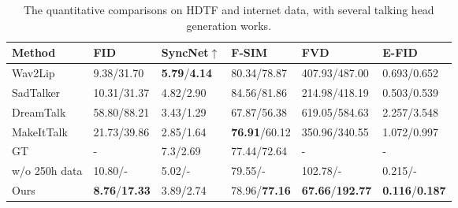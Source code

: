 \begin{table}[h!]
  \centering
  \caption{The quantitative comparisons on HDTF and internet data, with several talking head generation works.}
  \label{tab:quantitative_comp}
  \begin{tabularx}{\textwidth}{l>{\centering\arraybackslash}X>{\centering\arraybackslash}X>{\centering\arraybackslash}X>{\centering\arraybackslash}X>{\centering\arraybackslash}X}
    \toprule
    Method & FID & SyncNet$\uparrow$ & F-SIM & FVD &  E-FID\\
    \midrule
    Wav2Lip\cite{wav2lip} & {\scriptsize 9.38/31.70} & {\scriptsize \textbf{5.79}/\textbf{4.14}} & {\scriptsize 80.34/78.87} & {\scriptsize 407.93/487.00} & {\scriptsize 0.693/0.652} \\
    SadTalker\cite{sadtalker} & {\scriptsize 10.31/31.37} & {\scriptsize 4.82/2.90} & {\scriptsize 84.56/81.86} & {\scriptsize 214.98/418.19} & {\scriptsize 0.503/0.539} \\
    DreamTalk\cite{dreamtalk} & {\scriptsize 58.80/88.21} & {\scriptsize 3.43/1.29} & {\scriptsize 67.87/56.38} & {\scriptsize 619.05/584.63} & {\scriptsize 2.257/3.548}\\
    MakeItTalk\cite{MakeItTalk} & {\scriptsize 21.73/39.86} & {\scriptsize 2.85/1.64} & {\scriptsize \textbf{76.91}/60.12} & {\scriptsize 350.96/340.55} & {\scriptsize 1.072/0.997} \\
    GT & - & {\scriptsize 7.3/2.69} & {\scriptsize 77.44/72.64} & - & -\\
    
    w/o 250h data & {\scriptsize 10.80/-} & {\scriptsize 5.02/-} & {\scriptsize 79.55/-}  & {\scriptsize 102.78/-} & {\scriptsize 0.215/-} \\
    
    Ours & {\scriptsize \textbf{8.76}/\textbf{17.33}} & {\scriptsize 3.89/2.74} & {\scriptsize 78.96/\textbf{77.16}}  & {\scriptsize \textbf{67.66}/\textbf{192.77}} & {\scriptsize \textbf{0.116}/\textbf{0.187}} \\
    \bottomrule
  \end{tabularx}
\end{table}

